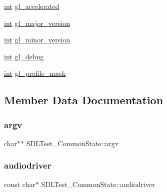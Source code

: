 \begin{DoxyCompactItemize}
\item 
\mbox{\hyperlink{warnings_8h_a74f207b5aa4ba51c3a2ad59b219a423b}{int}} \mbox{\hyperlink{struct_s_d_l_test___common_state_a2dca523be403a9ff6fe2dd7b1808baba}{gl\+\_\+accelerated}}
\item 
\mbox{\hyperlink{warnings_8h_a74f207b5aa4ba51c3a2ad59b219a423b}{int}} \mbox{\hyperlink{struct_s_d_l_test___common_state_a766e471516e0a39d0bb8c14ea2042bdf}{gl\+\_\+major\+\_\+version}}
\item 
\mbox{\hyperlink{warnings_8h_a74f207b5aa4ba51c3a2ad59b219a423b}{int}} \mbox{\hyperlink{struct_s_d_l_test___common_state_a5a50c65004454c791da21a3473388608}{gl\+\_\+minor\+\_\+version}}
\item 
\mbox{\hyperlink{warnings_8h_a74f207b5aa4ba51c3a2ad59b219a423b}{int}} \mbox{\hyperlink{struct_s_d_l_test___common_state_a2710657ef2a0c8aabebc5fceb01c71b5}{gl\+\_\+debug}}
\item 
\mbox{\hyperlink{warnings_8h_a74f207b5aa4ba51c3a2ad59b219a423b}{int}} \mbox{\hyperlink{struct_s_d_l_test___common_state_aa923ff5f227c35523a4e491863a7d907}{gl\+\_\+profile\+\_\+mask}}
\end{DoxyCompactItemize}


\subsection{Member Data Documentation}
\mbox{\label{struct_s_d_l_test___common_state_a6db840410b86ab7c6807763fd8bcb081}} 
\subsubsection{\texorpdfstring{argv}{argv}}
{\footnotesize\ttfamily char$\ast$$\ast$ S\+D\+L\+Test\+\_\+\+Common\+State\+::argv}

\mbox{\label{struct_s_d_l_test___common_state_ae51671cdec7979ca844f19b650b75300}} 
\subsubsection{\texorpdfstring{audiodriver}{audiodriver}}
{\footnotesize\ttfamily const char$\ast$ S\+D\+L\+Test\+\_\+\+Common\+State\+::audiodriver}

